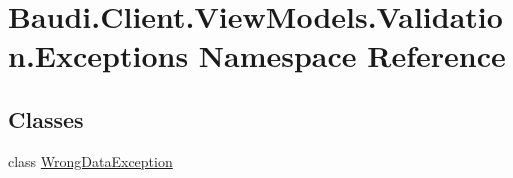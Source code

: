 \hypertarget{namespace_baudi_1_1_client_1_1_view_models_1_1_validation_1_1_exceptions}{}\section{Baudi.\+Client.\+View\+Models.\+Validation.\+Exceptions Namespace Reference}
\label{namespace_baudi_1_1_client_1_1_view_models_1_1_validation_1_1_exceptions}
\subsection*{Classes}
\begin{DoxyCompactItemize}
\item 
class \hyperlink{class_baudi_1_1_client_1_1_view_models_1_1_validation_1_1_exceptions_1_1_wrong_data_exception}{Wrong\+Data\+Exception}
\end{DoxyCompactItemize}
